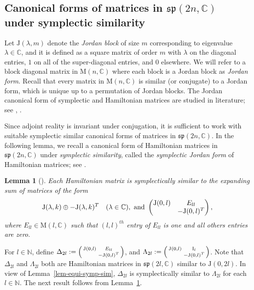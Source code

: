 \documentclass[11pt,reqno]{amsart}
\numberwithin{equation}{section}
\newtheorem{lemma}[theorem]{Lemma}
\theoremstyle{definition}
\def\C{\mathbb C}
\def\N{\mathbb N}
\def\C{\mathbb {C}}
\def\N{\mathbb {N}}
\newcommand{\lemref}[1]{Lemma~\ref{#1}}
\begin{document}
\subsection{Canonical forms of matrices in  $ \mathfrak{sp}(2n,\mathbb{C})$  under symplectic similarity}\label{subsec-canonical-form}

Let $ \mathrm{J}(\lambda, m)$  denote the \textit{Jordan block} of size $m$ corresponding to eigenvalue $ \lambda  \in \C$, and it is defined as a square matrix of order $m$
with $ \lambda $ on the diagonal entries, $1$ on all of the super-diagonal entries, and $0$ elsewhere. We will refer to a block diagonal matrix in  $\mathrm{M}(n,\C)$ where each block is a Jordan block as  \textit{Jordan form}. Recall that every matrix in  $\mathrm{M}(n,\C)$ is similar (or conjugate) to a Jordan form, which is unique up to a permutation of Jordan blocks. The Jordan canonical form of symplectic and Hamiltonian matrices are studied in literature; see \cite{LMX}, \cite[Theorem 4, Theorem 5]{CMP}. 


Since adjoint reality is invariant under conjugation, it is sufficient to work with suitable symplectic similar canonical forms of matrices in  $ \mathfrak{sp}(2n,\mathbb{C})$.
In the following lemma, we recall a canonical form of Hamiltonian matrices in $ \mathfrak{sp}(2n,\mathbb{C})$  under \textit{symplectic similarity}, called the \textit{symplectic Jordan form} of  Hamiltonian matrices; see \cite{Cr}.
\begin{lemma}[{\cite[Lemma 6]{Cr}}]\label{lem-canonical-form-Cruz}
	Each Hamiltonian matrix is symplectically similar to the expanding sum of matrices of the form
	\begin{equation}
		\mathrm{J}(\lambda, k) \oplus - \mathrm{J}(\lambda, k)^{T}  \quad (\lambda \in \C), \hbox{ and }  \begin{pmatrix}
			\mathrm{J}(0, l) & E_{ll}\\
			& - \mathrm{J}(0, l)^{T}
		\end{pmatrix},
	\end{equation}
	where $E_{ll} \in \mathrm{M}(l, \C)$ such that $(l, l)^{th}$ entry of $E_{ll}$ is one and all others entries are zero.
\end{lemma}


For $l \in \N$, define $\Delta_{2l}:= \begin{psmallmatrix}
	\mathrm{J}(0, l) & E_{ll}\\
	& - \mathrm{J}(0, l)^{T}
\end{psmallmatrix} $, and  $\Lambda_{2l} := \begin{psmallmatrix}
	\mathrm{J}(0, l) & \mathrm{I}_{l} \\
	& - \mathrm{J}(0, l)^{T}
\end{psmallmatrix} $. Note that $\Delta_{2l}$ and $\Lambda_{2l} $ both are Hamiltonian matrices   in $\mathfrak{sp}(2l,\C)$ similar to  $\mathrm{J}(0, 2l)$. In view of \lemref{lem-equi-symp-sim}, $\Delta_{2l}$ is symplectically similar to $\Lambda_{2l} $ for each $l \in \N$.  The next result follows from  \lemref{lem-canonical-form-Cruz}. 
\end{document}
